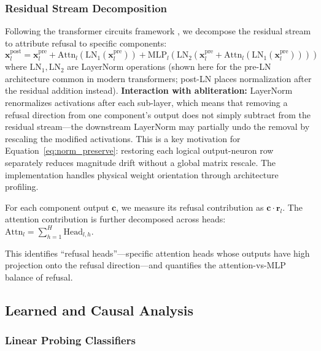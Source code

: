 \documentclass[11pt]{article}
\begin{document}
\subsubsection{Residual Stream Decomposition}
\label{sec:residual_stream}

Following the transformer circuits framework \citep{elhage2021mathematical}, we decompose the residual stream to attribute refusal to specific components:
\begin{equation}
    \mathbf{x}_l^{\text{post}} = \mathbf{x}_l^{\text{pre}} + \text{Attn}_l(\text{LN}_1(\mathbf{x}_l^{\text{pre}})) + \text{MLP}_l(\text{LN}_2(\mathbf{x}_l^{\text{pre}} + \text{Attn}_l(\text{LN}_1(\mathbf{x}_l^{\text{pre}}))))
\end{equation}
where $\text{LN}_1, \text{LN}_2$ are LayerNorm operations (shown here for the pre-LN architecture common in modern transformers; post-LN places normalization after the residual addition instead). \textbf{Interaction with abliteration:} LayerNorm renormalizes activations after each sub-layer, which means that removing a refusal direction from one component's output does not simply subtract from the residual stream---the downstream LayerNorm may partially undo the removal by rescaling the modified activations. This is a key motivation for Equation~\ref{eq:norm_preserve}: restoring each logical output-neuron row separately reduces magnitude drift without a global matrix rescale. The implementation handles physical weight orientation through architecture profiling.

For each component output $\mathbf{c}$, we measure its refusal contribution as $\mathbf{c} \cdot \mathbf{r}_l$. The attention contribution is further decomposed across heads:
$\text{Attn}_l = \sum_{h=1}^{H} \text{Head}_{l,h}$.

This identifies ``refusal heads''---specific attention heads whose outputs have high projection onto the refusal direction---and quantifies the attention-vs-MLP balance of refusal.

\subsection{Learned and Causal Analysis}

\subsubsection{Linear Probing Classifiers}
\label{sec:linear_probing}
\end{document}
